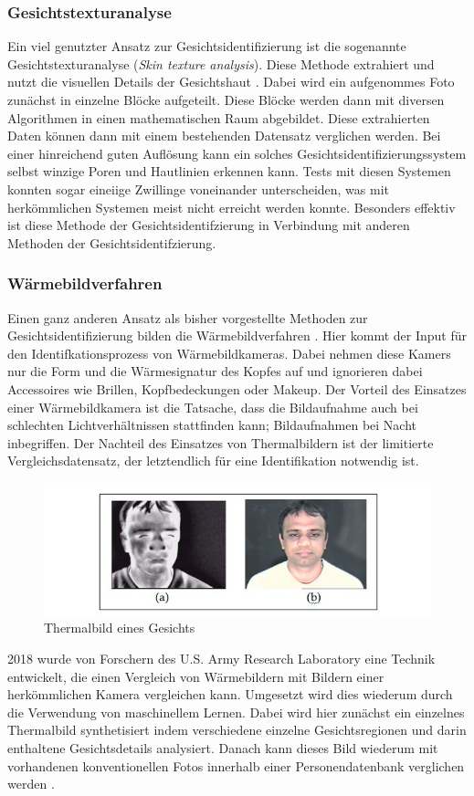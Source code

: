 \documentclass[doktyp=semarbeit, sprache=german]{TUBAFarbeiten}
\begin{document}
\subsubsection{Gesichtstexturanalyse}
Ein viel genutzter Ansatz zur Gesichtsidentifizierung ist die sogenannte Gesichtstexturanalyse (\textit{Skin texture analysis}). Diese Methode extrahiert und nutzt die visuellen Details der Gesichtshaut \cite{SkinTexture}. Dabei wird ein aufgenommes Foto zunächst in einzelne Blöcke aufgeteilt. Diese Blöcke werden dann mit diversen Algorithmen in einen mathematischen Raum abgebildet. Diese extrahierten Daten können dann mit einem bestehenden Datensatz verglichen werden. Bei einer hinreichend guten Auflösung kann ein solches Gesichtsidentifizierungssystem selbst winzige Poren und Hautlinien erkennen kann. Tests mit diesen Systemen konnten sogar eineiige Zwillinge voneinander unterscheiden, was mit herkömmlichen Systemen meist nicht erreicht werden konnte. Besonders effektiv ist diese Methode der Gesichtsidentifzierung in Verbindung mit anderen Methoden der Gesichtsidentifzierung.
\subsubsection{Wärmebildverfahren}
Einen ganz anderen Ansatz als bisher vorgestellte Methoden zur Gesichtsidentifizierung bilden die Wärmebildverfahren \cite{Thermal}. Hier kommt der Input für den Identifkationsprozess von Wärmebildkameras. Dabei nehmen diese Kamers nur die Form und die Wärmesignatur des Kopfes auf und ignorieren dabei Accessoires wie Brillen, Kopfbedeckungen oder Makeup. Der Vorteil des Einsatzes einer Wärmebildkamera ist die Tatsache, dass die Bildaufnahme auch bei schlechten Lichtverhältnissen stattfinden kann; Bildaufnahmen bei Nacht inbegriffen. Der Nachteil des Einsatzes von Thermalbildern ist der limitierte Vergleichsdatensatz, der letztendlich für eine Identifikation notwendig ist.
\begin{figure}
	\centering
	\includegraphics[width=1\textwidth]{images/thermal}
	\caption{Thermalbild eines Gesichts \cite{Thermal}}
	\label{img:thermal}
\end{figure}
2018 wurde von Forschern des U.S. Army Research Laboratory eine Technik entwickelt, die einen Vergleich von Wärmebildern mit Bildern einer herkömmlichen Kamera vergleichen kann. Umgesetzt wird dies wiederum durch die Verwendung von maschinellem Lernen. Dabei wird hier zunächst ein einzelnes Thermalbild synthetisiert indem verschiedene einzelne Gesichtsregionen und darin enthaltene Gesichtsdetails analysiert. Danach kann dieses Bild wiederum mit vorhandenen konventionellen Fotos innerhalb einer Personendatenbank verglichen werden \cite{Army}.
\end{document}
